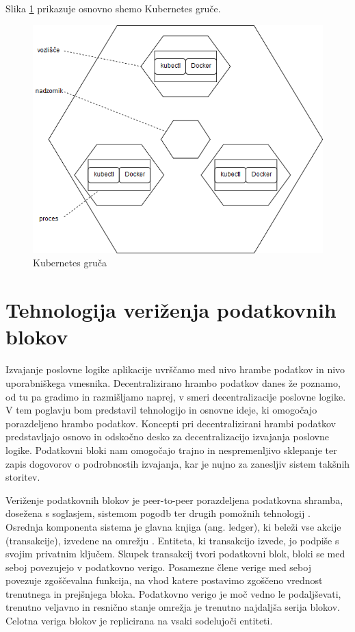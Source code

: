 \documentclass[a4paper, 12pt]{book}
\begin{document}
Slika \ref{kubernetes_cluster} prikazuje osnovno shemo Kubernetes gruče.

\begin{figure}[h]
	\includegraphics[width=1.0\textwidth]{slike/kubernetes_cluster.png}
	\caption{Kubernetes gruča \cite{kubernetesTutorial}}
	\label{kubernetes_cluster}
\end{figure}


\chapter{Tehnologija veriženja podatkovnih blokov}
\label{ch2}

Izvajanje poslovne logike aplikacije uvrščamo med nivo hrambe podatkov in nivo uporabniškega vmesnika.
Decentralizirano hrambo podatkov danes že poznamo, od tu pa gradimo in razmišljamo naprej, v smeri decentralizacije poslovne logike.
V tem poglavju bom predstavil tehnologijo in osnovne ideje, ki omogočajo porazdeljeno hrambo podatkov.
Koncepti pri decentralizirani hrambi podatkov predstavljajo osnovo in odskočno desko za decentralizacijo izvajanja poslovne logike.
Podatkovni bloki nam omogočajo trajno in nespremenljivo sklepanje ter zapis dogovorov o podrobnostih izvajanja, kar je nujno za zanesljiv sistem takšnih storitev.

Veriženje podatkovnih blokov je peer-to-peer porazdeljena podatkovna shramba, dosežena s soglasjem, sistemom  pogodb ter drugih pomožnih tehnologij \cite{hyperledgerWeb}. Osrednja komponenta sistema je glavna knjiga (ang. ledger), ki beleži vse akcije (transakcije), izvedene na omrežju \cite{hyperledgerDocs}.
Entiteta, ki transakcijo izvede, jo podpiše s svojim privatnim ključem.
Skupek transakcij tvori podatkovni blok, bloki se med seboj povezujejo v podatkovno verigo.
Posamezne člene verige med seboj povezuje zgoščevalna funkcija, na vhod katere postavimo zgoščeno vrednost trenutnega in prejšnjega bloka.
Podatkovno verigo je moč vedno le podaljševati, trenutno veljavno in resnično stanje omrežja je trenutno najdaljša serija blokov.
Celotna veriga blokov je replicirana na vsaki sodelujoči entiteti.
\end{document}
